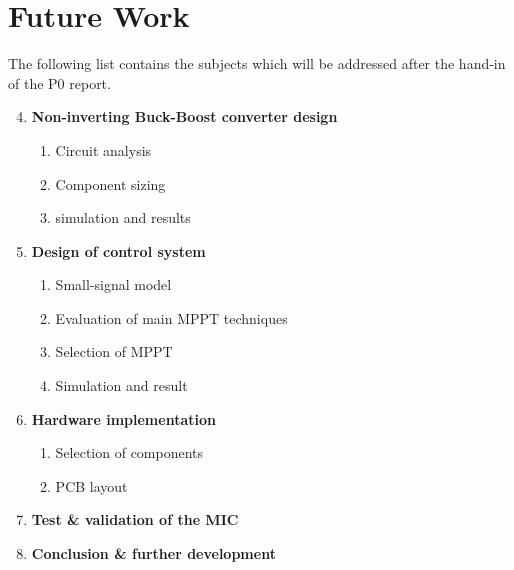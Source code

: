 \chapter{Future Work}
The following list contains the subjects which will be addressed after the hand-in of the P0 report.

\renewcommand{\labelenumii}{\arabic{enumii}}
\begin{enumerate}
	\setcounter{enumi}{3}
	\item \textbf{Non-inverting Buck-Boost converter design}
	\begin{enumerate}
		\item Circuit analysis
		\item Component sizing
		\item simulation and results
	\end{enumerate}

	\item \textbf{Design of control system}
	\begin{enumerate}
		\item Small-signal model
		\item Evaluation of main MPPT techniques
		\item Selection of MPPT
		\item Simulation and result
	\end{enumerate}
	
	\item \textbf{Hardware implementation}
	\begin{enumerate}
		\item Selection of components
		\item PCB layout
	\end{enumerate}

	\item \textbf{Test \& validation of the MIC}
	\item \textbf{Conclusion \& further development}
\end{enumerate}